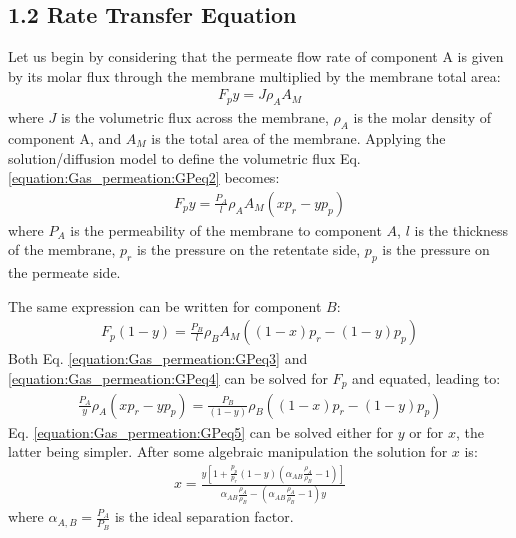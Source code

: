 \documentclass[letterpaper,10pt,english]{jupyterBook}
\begin{document}
\subsection{1.2 Rate Transfer Equation}
\label{\detokenize{Gas_permeation:rate-transfer-equation}}
\sphinxAtStartPar
Let us begin by considering that the permeate flow rate of component A is given by its molar flux through the membrane multiplied by the membrane total area:
\begin{equation}\label{equation:Gas_permeation:GPeq2}
\begin{split}
F_py=J\rho_AA_M
\end{split}
\end{equation}
\sphinxAtStartPar
where \(J\) is the volumetric flux across the membrane, \(\rho_A\) is the molar density of component A, and \(A_M\) is the total area of the membrane. Applying the solution/diffusion model to define the volumetric flux Eq. \eqref{equation:Gas_permeation:GPeq2} becomes:
\begin{equation}\label{equation:Gas_permeation:GPeq3}
\begin{split}
F_py=\frac{P_A}{l}\rho_AA_M\left(xp_r-yp_p\right)
\end{split}
\end{equation}
\sphinxAtStartPar
where \(P_A\) is the permeability of the membrane to component \(A\), \(l\) is the thickness of the membrane, \(p_r\) is the pressure on the retentate side, \(p_p\) is the pressure on the permeate side.

\sphinxAtStartPar
The same expression can be written for component \(B\):
\begin{equation}\label{equation:Gas_permeation:GPeq4}
\begin{split}
F_p(1-y)=\frac{P_B}{l}\rho_BA_M\left((1-x)p_r-(1-y)p_p\right)
\end{split}
\end{equation}
\sphinxAtStartPar
Both Eq. \eqref{equation:Gas_permeation:GPeq3} and \eqref{equation:Gas_permeation:GPeq4} can be solved for \(F_p\) and equated, leading to:
\begin{equation}\label{equation:Gas_permeation:GPeq5}
\begin{split}
\frac{P_A}{y}\rho_A\left(xp_r-yp_p\right)=\frac{P_B}{(1-y)}\rho_B\left((1-x)p_r-(1-y)p_p\right)
\end{split}
\end{equation}
\sphinxAtStartPar
Eq. \eqref{equation:Gas_permeation:GPeq5} can be solved either for \(y\) or for \(x\), the latter being simpler. After some algebraic manipulation the solution for \(x\) is:
\begin{equation}\label{equation:Gas_permeation:GPeq6}
\begin{split}
x=\frac{y\left[1+\frac{p_p}{p_r}(1-y)\left(\alpha_{AB}\frac{\rho_A}{\rho_B}-1\right)\right]}{\alpha_{AB}\frac{\rho_A}{\rho_B}-\left(\alpha_{AB}\frac{\rho_A}{\rho_B}-1\right)y}
\end{split}
\end{equation}
\sphinxAtStartPar
where \(\alpha_{A,B}=\frac{P_A}{P_B}\) is the ideal separation factor.
\end{document}
